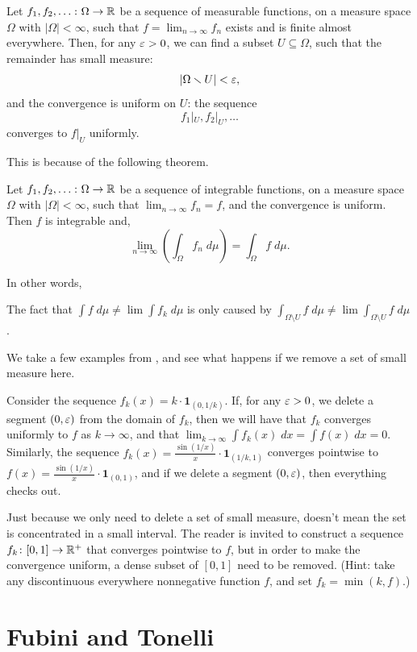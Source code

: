 \begin{theorem}
	Let $f_1, f_2, \dots \colon \Omega \to \mathbb R$
	be a sequence of measurable functions, on a measure space $\Omega$ with $|\Omega| < \infty$,
	such that $f = \lim_{n \to \infty} f_n$ exists and is finite almost everywhere.
	Then, for any $\varepsilon>0$,
	we can find a subset $U \subseteq \Omega$, such that
	the remainder has small measure:
	\[
		|\Omega \smallsetminus U| < \varepsilon,
	\]
	and the convergence is uniform on $U$: the sequence
	\[
		f_1|_U, f_2|_U, \dots
	\]
	converges to $f|_U$ uniformly.
\end{theorem}

This is because of the following theorem.
\begin{theorem}
	Let $f_1, f_2, \dots \colon \Omega \to \mathbb R$
	be a sequence of integrable functions, on a measure space $\Omega$ with $|\Omega| < \infty$,
	such that $\lim_{n \to \infty} f_n = f$, and the convergence is uniform.
	Then $f$ is integrable and,
	\[ \lim_{n \to \infty} \left( \int_\Omega f_n \; d\mu \right)
		= \int_\Omega f \; d\mu. \]
\end{theorem}

In other words,
\begin{moral}
	The fact that $\int f \; d\mu \neq \lim \int f_k \; d\mu$ is only caused by
	$\int_{ \Omega \setminus U } f \; d\mu \neq \lim \int_{ \Omega \setminus U } f \; d\mu$.
\end{moral}

\begin{example}
	We take a few examples from , and see what happens if we remove
	a set of small measure here.
	\begin{itemize}
		\ii Consider the sequence $f_k(x) = k \cdot \mathbf{1}_{(0, 1/k)}$. If, for any $\varepsilon>0$,
		we delete a segment $(0, \varepsilon)$ from the domain of $f_k$, then we will have that $f_k$ converges
		uniformly to $f$ as $k \to \infty$, and that $\lim_{k \to \infty} \int f_k(x) \; dx = \int f(x)
		\; dx = 0$.
		\ii Similarly, the sequence $f_k(x) = \frac{\sin(1/x)}{x} \cdot \mathbf{1}_{(1/k, 1)}$
		converges pointwise to $f(x) = \frac{\sin(1/x)}{x} \cdot \mathbf{1}_{(0, 1)}$,
		and if we delete a segment $(0, \varepsilon)$, then everything checks out.
	\end{itemize}
\end{example}

\begin{remark}
	Just because we only need to delete a set of small measure, doesn't mean the set is concentrated in a
	small interval. The reader is invited to construct a sequence $f_k \colon [0, 1] \to \mathbb R^+$
	that converges pointwise to $f$, but in order to make the convergence uniform, a dense subset of $[0,
	1]$ need to be removed.
	(Hint: take any discontinuous everywhere nonnegative function $f$, and set $f_k = \min(k, f)$.)
\end{remark}

\section{Fubini and Tonelli}

\section{\problemhead}
